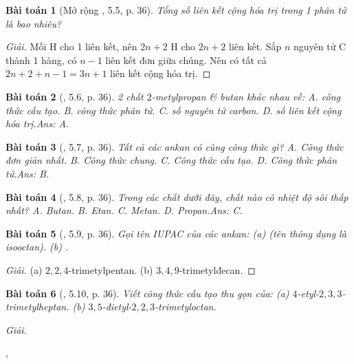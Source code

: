 \documentclass{article}
\newtheorem{baitoan}{Bài toán}
\begin{document}
\begin{baitoan}[Mở rộng \cite{SBT_Hoa_Hoc_11_co_ban}, 5.5, p. 36]
	Tổng số liên kết cộng hóa trị trong 1 phân tử \emph{} là bao nhiêu?
\end{baitoan}

\begin{proof}[Giải]
	Mỗi H cho 1 liên kết, nên $2n + 2$ H cho $2n + 2$ liên kết. Sắp $n$ nguyên tử C thành 1 hàng, có $n - 1$ liên kết đơn giữa chúng. Nên có tất cả $2n + 2 + n - 1 = 3n + 1$ liên kết cộng hóa trị.
\end{proof}

\begin{baitoan}[\cite{SBT_Hoa_Hoc_11_co_ban}, 5.6, p. 36]
	2 chất $2$-metylpropan \& butan khác nhau về: {\sf A.} công thức cấu tạo. {\sf B.} công thức phân tử. {\sf C.} số nguyên tử carbon. {\sf D.} số liên kết cộng hóa trị.\hfill{\sf Ans: A.}
\end{baitoan}

\begin{baitoan}[\cite{SBT_Hoa_Hoc_11_co_ban}, 5.7, p. 36]
	Tất cả các ankan có cùng công thức gì? {\sf A.} Công thức đơn giản nhất. {\sf B.} Công thức chung. {\sf C.} Công thức cấu tạo. {\sf D.} Công thức phân tử.\hfill{\sf Ans: B.}
\end{baitoan}

\begin{baitoan}[\cite{SBT_Hoa_Hoc_11_co_ban}, 5.8, p. 36]
	Trong các chất dưới đây, chất nào có nhiệt độ sôi thấp nhất? {\sf A.} Butan. {\sf B.} Etan. {\sf C.} Metan. {\sf D.} Propan.\hfill{\sf Ans: C.}
\end{baitoan}

\begin{baitoan}[\cite{SBT_Hoa_Hoc_11_co_ban}, 5.9, p. 36]
	Gọi tên IUPAC của các ankan: (a) \emph{} (tên thông dụng là \emph{isooctan}). (b) \emph{}.
\end{baitoan}

\begin{proof}[Giải]
	(a) $2,2,4$-trimetylpentan. (b) $3,4,9$-trimetylđecan.
\end{proof}

\begin{baitoan}[\cite{SBT_Hoa_Hoc_11_co_ban}, 5.10, p. 36]
	Viết công thức cấu tạo thu gọn của: (a) $4$-etyl-$2,3,3$-trimetylheptan. (b) $3,5$-đietyl-$2,2,3$-trimetyloctan.
\end{baitoan}
\noindent\textit{Giải.}
\begin{center}
	,\hspace{1cm}
\end{center}
\end{document}

